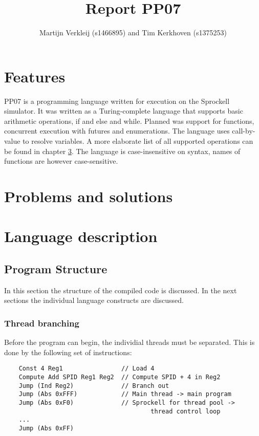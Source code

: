\documentclass[10pt,a4paper]{report}
\author{Martijn Verkleij (s1466895) and Tim Kerkhoven (s1375253)}
\title{Report PP07}
\begin{document}
\maketitle
\tableofcontents


\chapter{Features}
PP07 is a programming language written for execution on the Sprockell simulator. It was written as a Turing-complete language that supports basic arithmetic operations, if and else and while. Planned was support for functions, concurrent execution with futures and enumerations. The language uses call-by-value to resolve variables. A more elaborate list of all supported operations can be found in chapter \ref{chp:langdesc}. The language is case-insensitive on syntax, names of functions are however case-sensitive.

\chapter{Problems and solutions}



\chapter{Language description} \label{chp:langdesc}

\section{Program Structure} \label{sec:structure}
In this section the structure of the compiled code is discussed. In the next sections the individual language constructs are discussed. 
\subsection{Thread branching}
Before the program can begin, the individial threads must be separated. This is done by the following set of instructions:
\begin{lstlisting}
	Const 4 Reg1				// Load 4
	Compute Add SPID Reg1 Reg2	// Compute SPID + 4 in Reg2
	Jump (Ind Reg2)				// Branch out
	Jump (Abs 0xFFF)			// Main thread -> main program
	Jump (Abs 0xF0)				// Sprockell for thread pool -> 
										thread control loop
	...
	Jump (Abs 0xFF)
\end{lstlisting}
\end{document}
